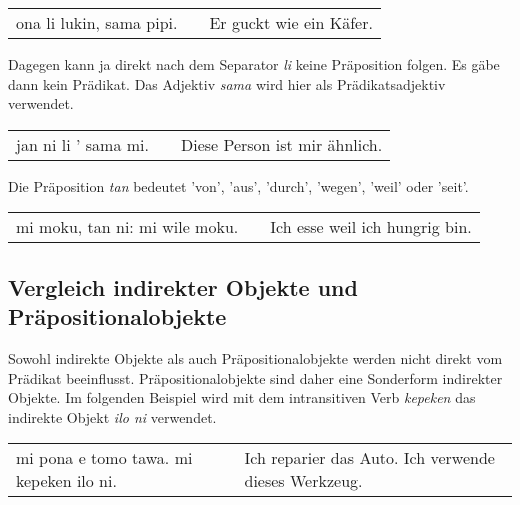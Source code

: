 \begin{supertabular}{p{5,5cm}|ll}
ona li lukin, sama pipi. && Er guckt wie ein Käfer. \\
\end{supertabular} 

Dagegen kann ja direkt nach dem Separator \textit{li} keine Präposition folgen. 
Es gäbe dann kein Prädikat. 
Das Adjektiv \textit{sama} wird hier als Prädikatsadjektiv verwendet.

\begin{supertabular}{p{5,5cm}|ll}
jan ni li ' sama mi. && Diese Person ist mir ähnlich. \\
\end{supertabular} 

%
% 
Die Präposition \textit{tan} bedeutet 'von', 'aus', 'durch', 'wegen', 'weil' oder 'seit'.

\begin{supertabular}{p{5,5cm}|ll}
mi moku, tan ni: mi wile moku. &&  Ich esse weil ich hungrig bin. \\
\end{supertabular} 

%
\subsection*{Vergleich indirekter Objekte und Präpositionalobjekte}
%
%

Sowohl indirekte Objekte als auch Präpositionalobjekte werden nicht direkt vom Prädikat beeinflusst. 
Präpositionalobjekte sind daher eine Sonderform indirekter Objekte. 
Im folgenden Beispiel wird mit dem intransitiven Verb \textit{kepeken} das indirekte Objekt \textit{ilo ni} verwendet.

\begin{supertabular}{p{5,5cm}|ll}
mi pona e tomo tawa. mi kepeken ilo ni. && Ich reparier das Auto. Ich verwende dieses Werkzeug. \\
\end{supertabular} 

